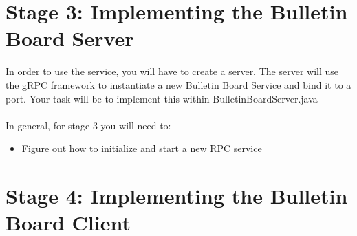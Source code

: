 \documentclass{article}
\begin{document}


\section{Stage 3: Implementing the Bulletin Board Server} %

In order to use the service, you will have to create a server. The server will use the gRPC framework to instantiate a new Bulletin Board Service and bind it to a port.  Your task will be to implement this within BulletinBoardServer.java \\\\In general, for stage 3 you will need to:
\begin{itemize}
\item Figure out how to initialize and start a new RPC service
\end{itemize}




\section{Stage 4: Implementing the Bulletin Board Client } %
\end{document}

